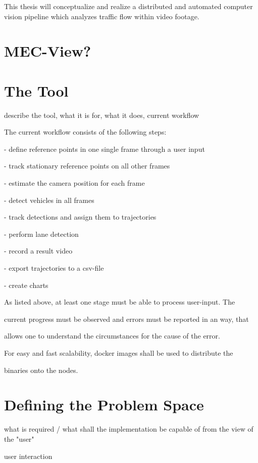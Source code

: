 This thesis will conceptualize and realize a distributed and automated computer vision pipeline which analyzes traffic flow within video footage.



\section{MEC-View?}

\section{The Tool}

describe the tool, what it is for, what it does, current workflow

The current workflow consists of the following steps:

- define reference points in one single frame through a user input

- track stationary reference points on all other frames

- estimate the camera position for each frame

- detect vehicles in all frames

- track detections and assign them to trajectories

- perform lane detection

- record a result video

- export trajectories to a csv-file

- create charts



As listed above, at least one stage must be able to process user-input. The

current progress must be observed and errors must be reported in an way, that

allows one to understand the circumstances for the cause of the error.

For easy and fast scalability, docker images shall be used to distribute the

binaries onto the nodes.


\section{Defining the Problem Space}

what is required / what shall the implementation be capable of from the view of the "user"

user interaction



